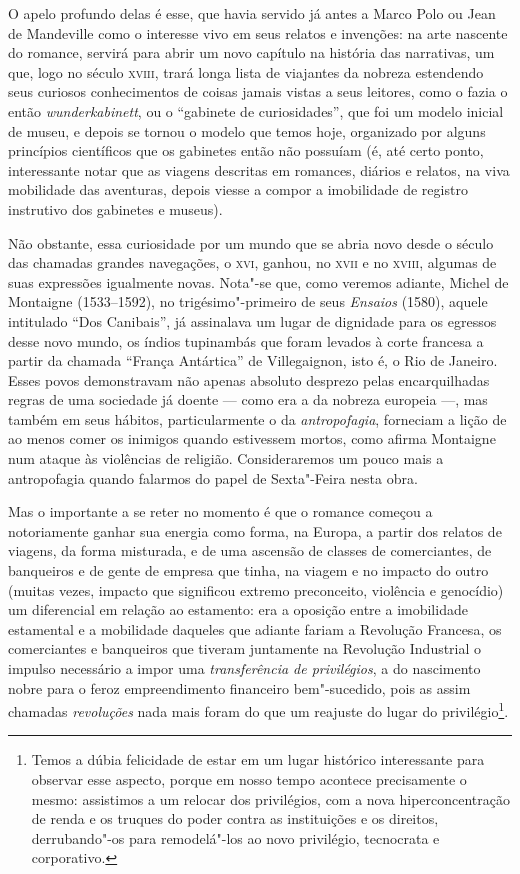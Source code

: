 O apelo profundo delas é esse, que havia servido já antes a Marco Polo
ou Jean de Mandeville como o interesse vivo em seus relatos e invenções:
na arte nascente do romance, servirá para abrir um novo capítulo na
história das narrativas, um que, logo no século \textsc{xviii}, trará longa lista
de viajantes da nobreza estendendo seus curiosos conhecimentos de coisas
jamais vistas a seus leitores, como o fazia o então
\emph{wunderkabinett}, ou o ``gabinete de curiosidades'', que foi um
modelo inicial de museu, e depois se tornou o modelo que temos hoje,
organizado por alguns princípios científicos que os gabinetes então não
possuíam (é, até certo ponto, interessante notar que as viagens
descritas em romances, diários e relatos, na viva mobilidade das
aventuras, depois viesse a compor a imobilidade de registro instrutivo
dos gabinetes e museus).

Não obstante, essa curiosidade por um mundo que se abria novo desde o
século das chamadas grandes navegações, o \textsc{xvi}, ganhou, no \textsc{xvii} e no
\textsc{xviii}, algumas de suas expressões igualmente novas. Nota"-se que, como
veremos adiante, Michel de Montaigne (1533--1592), no trigésimo"-primeiro
de seus \emph{Ensaios} (1580), aquele intitulado ``Dos Canibais'', já
assinalava um lugar de dignidade para os egressos desse novo mundo, os
índios tupinambás que foram levados à corte francesa a partir da chamada
``França Antártica'' de Villegaignon, isto é, o Rio de Janeiro. Esses
povos demonstravam não apenas absoluto desprezo pelas encarquilhadas
regras de uma sociedade já doente --- como era a da nobreza europeia
---, mas também em seus hábitos, particularmente o da
\emph{antropofagia}, forneciam a lição de ao menos comer os inimigos
quando estivessem mortos, como afirma Montaigne num ataque às violências
de religião. Consideraremos um pouco mais a antropofagia quando falarmos
do papel de Sexta"-Feira nesta obra.

Mas o importante a se reter no momento é que o romance começou a
notoriamente ganhar sua energia como forma, na Europa, a partir dos
relatos de viagens, da forma misturada, e de uma ascensão de classes de
comerciantes, de banqueiros e de gente de empresa que tinha, na viagem e
no impacto do outro (muitas vezes, impacto que significou extremo
preconceito, violência e genocídio) um diferencial em relação ao
estamento: era a oposição entre a imobilidade estamental e a mobilidade
daqueles que adiante fariam a Revolução Francesa, os comerciantes e
banqueiros que tiveram juntamente na Revolução Industrial o impulso
necessário a impor uma \emph{transferência de privilégios}, a do
nascimento nobre para o feroz empreendimento financeiro bem"-sucedido,
pois as assim chamadas \emph{revoluções} nada mais foram do que um
reajuste do lugar do privilégio\footnote{Temos a dúbia felicidade de
  estar em um lugar histórico interessante para observar esse aspecto,
  porque em nosso tempo acontece precisamente o mesmo: assistimos a um
  relocar dos privilégios, com a nova hiperconcentração de renda e os
  truques do poder contra as instituições e os direitos, derrubando"-os
  para remodelá"-los ao novo privilégio, tecnocrata e corporativo.}.

